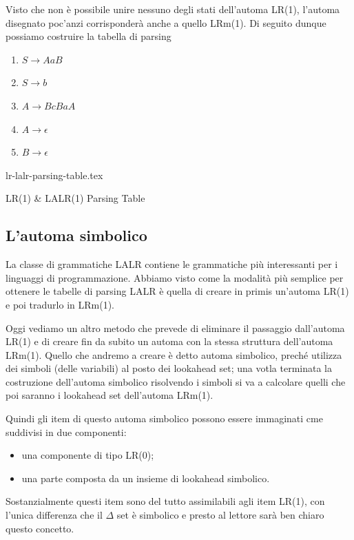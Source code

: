 \documentclass[class=book, crop=false, oneside, 12pt]{standalone}
\begin{document}
Visto che non è possibile unire nessuno degli stati dell'automa LR(1), l'automa disegnato poc'anzi corrisponderà anche a quello LRm(1). Di seguito dunque possiamo costruire la tabella di parsing

\begin{enumerate}
    \item \(S \to AaB\) 
    \item \(S \to b\) 
    \item \(A \to BcBaA\) 
    \item \(A \to \epsilon\) 
    \item \(B \to \epsilon\)
\end{enumerate}

\begin{table}[h]
    \centering
    {lr-lalr-parsing-table.tex}
    \caption{LR(1) \& LALR(1) Parsing Table}
    \label{tab:lr-lalr-parsing-table}
\end{table}


\subsection{L'automa simbolico}
La classe di grammatiche LALR contiene le grammatiche più interessanti per i linguaggi di programmazione.
Abbiamo visto come la modalità più semplice per ottenere le tabelle di parsing LALR è quella di creare in primis un'automa LR(1) e poi tradurlo in LRm(1).

Oggi vediamo un altro metodo che prevede di eliminare il passaggio dall'automa LR(1) e di creare fin da subito un automa con la stessa struttura dell'automa LRm(1).
Quello che andremo a creare è detto automa simbolico, preché utilizza dei simboli (delle variabili) al posto dei lookahead set; una votla terminata la costruzione dell'automa simbolico risolvendo i simboli si va a calcolare quelli che poi saranno i lookahead set dell'automa LRm(1).

Quindi gli item di questo automa simbolico possono essere immaginati cme suddivisi in due componenti:
\begin{itemize}
    \item una componente di tipo LR(0);
    \item una parte composta da un insieme di lookahead simbolico.
\end{itemize}
Sostanzialmente questi item sono del tutto assimilabili agli item LR(1), con l'unica differenza che il \(\Delta\) set è simbolico e presto al lettore sarà ben chiaro questo concetto.
\end{document}

